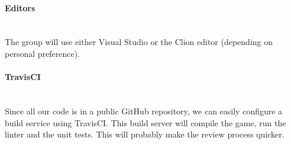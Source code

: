 \paragraph{Editors}
~\\ The group will use either Visual Studio or the Clion editor (depending on personal preference). 

\paragraph{TravisCI}
~\\ Since all our code is in a public GitHub repository, we can easily configure a build service using TravisCI. This build server will compile the game, run the linter and the unit tests. This will probably make the review process quicker.
 


